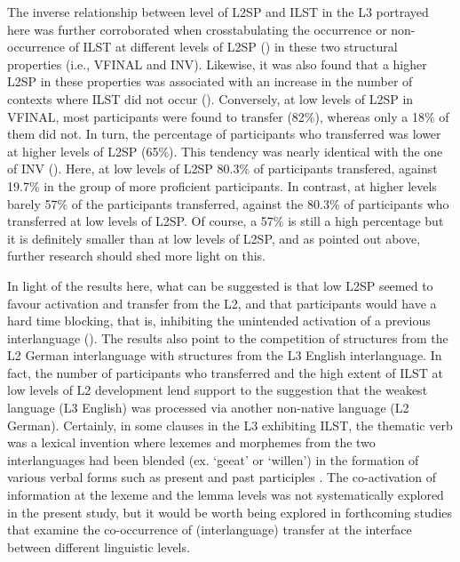\documentclass[output=paper,modfonts,nonflat, newtxmath]{langsci/langscibook}
\begin{document}
The inverse relationship between level of L2SP and ILST in the L3 portrayed here was further corroborated when crosstabulating the occurrence or non-occurrence of ILST at different levels of L2SP () in these two structural properties (i.e., VFINAL and INV). Likewise, it was also found that a higher L2SP in these properties was associated with an increase in the number of contexts where ILST did not occur (). Conversely, at low levels of L2SP in VFINAL, most participants were found to transfer (82\%), whereas only a 18\% of them did not. In turn, the percentage of participants who transferred was lower at higher levels of L2SP (65\%). This tendency was nearly identical with the one of INV (). Here, at low levels of L2SP 80.3\% of participants transfered, against 19.7\% in the group of more proficient participants. In contrast, at higher levels barely 57\% of the participants transferred, against the 80.3\% of participants who transferred at low levels of L2SP. Of course, a 57\% is still a high percentage but it is definitely smaller than at low levels of L2SP, and as pointed out above, further research should shed more light on this.

In light of the results here, what can be suggested is that low L2SP seemed to favour activation and transfer from the L2, and that participants would have a hard time blocking, that is, inhibiting the unintended activation of a previous interlanguage (\citealt{Shanon1991, Dewaele2001, DeBot2004, Sánchez2011, SánchezBardel2017}). The results also point to the competition of structures from the L2 German interlanguage with structures from the L3 English interlanguage. In fact, the number of participants who transferred and the high extent of ILST at low levels of L2 development lend support to the suggestion that the weakest language (L3 English) was processed \citep{Abunuwara1992} via another non-native language (L2 German). Certainly, in some clauses in the L3 exhibiting ILST, the thematic verb was a lexical invention where lexemes and morphemes from the two interlanguages had been blended (ex. ‘geeat’ or ‘willen’) in the formation of various verbal forms such as present and past participles \citep{Sánchez2015L2}. The co-activation of information at the lexeme and the lemma levels was not systematically explored in the present study, but it would be worth being explored in forthcoming studies that examine the co-occurrence of (interlanguage) transfer at the interface between different linguistic levels.
\end{document}
